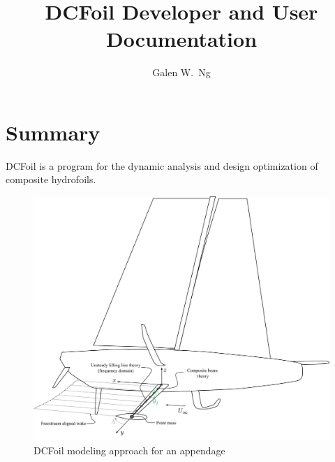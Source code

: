 \documentclass[10pt]{article}
\begin{document}
\title{\vspace{-1.5cm} DCFoil Developer and User Documentation}
\author{Galen W.~Ng}
\maketitle
\section*{Summary}
% 
DCFoil is a program for the dynamic analysis and design optimization of composite hydrofoils.
\begin{figure}[htbp!]
    \centering
    \includegraphics[width=1.0\linewidth,clip,trim={0cm 0cm 0cm 10cm}]{keel-dcfoil.pdf}
    \caption{\label{fig:keel-dcfoil}
        DCFoil modeling approach for an appendage
    }
\end{figure}

\clearpage
\tableofcontents
\clearpage
\end{document}
